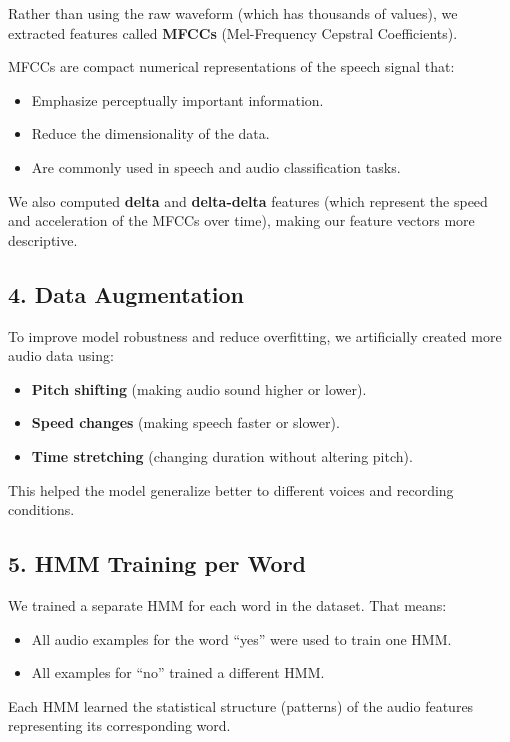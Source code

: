 \documentclass[11pt]{article}
\begin{document}
Rather than using the raw waveform (which has thousands of values), we extracted features called \textbf{MFCCs} (Mel-Frequency Cepstral Coefficients).

MFCCs are compact numerical representations of the speech signal that:
\begin{itemize}
    \item Emphasize perceptually important information.
    \item Reduce the dimensionality of the data.
    \item Are commonly used in speech and audio classification tasks.
\end{itemize}

We also computed \textbf{delta} and \textbf{delta-delta} features (which represent the speed and acceleration of the MFCCs over time), making our feature vectors more descriptive.

\subsection*{4. Data Augmentation}

To improve model robustness and reduce overfitting, we artificially created more audio data using:
\begin{itemize}
    \item \textbf{Pitch shifting} (making audio sound higher or lower).
    \item \textbf{Speed changes} (making speech faster or slower).
    \item \textbf{Time stretching} (changing duration without altering pitch).
\end{itemize}

This helped the model generalize better to different voices and recording conditions.

\subsection*{5. HMM Training per Word}

We trained a separate HMM for each word in the dataset. That means:
\begin{itemize}
    \item All audio examples for the word “yes” were used to train one HMM.
    \item All examples for “no” trained a different HMM.
\end{itemize}

Each HMM learned the statistical structure (patterns) of the audio features representing its corresponding word.
\end{document}
